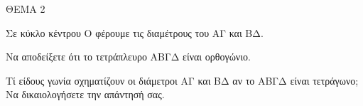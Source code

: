 
ΘΕΜΑ 2

Σε κύκλο κέντρου Ο φέρουμε τις διαμέτρους του ΑΓ και ΒΔ.

\begin{alist}
\item Να αποδείξετε ότι το τετράπλευρο ΑΒΓΔ είναι ορθογώνιο. 

\item Τί είδους γωνία σχηματίζουν οι διάμετροι ΑΓ και ΒΔ αν το ΑΒΓΔ είναι τετράγωνο; Να δικαιολογήσετε την απάντησή σας. 
\end{alist}
